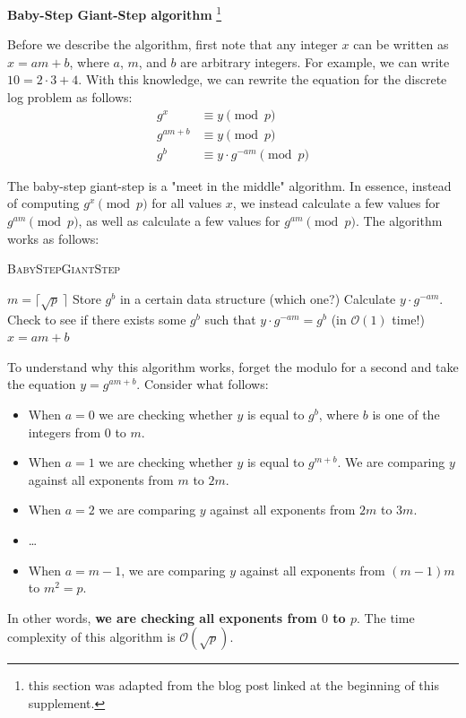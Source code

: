 \documentclass{article}
\begin{document}
    \begin{center}
        \textbf{Baby-Step Giant-Step algorithm}
        \footnote{this section was adapted from the blog post linked at the beginning of this supplement.}
    \end{center}

    Before we describe the algorithm, first note that any integer $x$ can be written as $x = am + b$, where $a$, $m$, and $b$ are arbitrary integers. For example, we can write $10 = 2 \cdot 3 + 4$. With this knowledge, we can rewrite the equation for the discrete log problem as follows:
    \begin{align*}
        g^{x} &\equiv y \pmod{p} \\
        g^{am + b} &\equiv y\pmod{p} \\
        g^{b} &\equiv y \cdot g^{-am} \pmod{p}
     \end{align*}

     The baby-step giant-step is a "meet in the middle" algorithm. In essence, instead of computing $g^{x} \pmod{p}$ for all values $x$, we instead calculate a few values for $g^{am} \pmod{p}$, as well as calculate a few values for $g^{am} \pmod{p}$. The algorithm works as follows:

     \begin{algorithm}
        \caption{\textsc{BabyStepGiantStep}}
        \label{alg:bsgs}
        \begin{algorithmic}
            \State $m = \lceil \sqrt{p}\ \rceil$
                \State Store $g^{b}$ in a certain data structure (which one?)
            \EndFor
                \State Calculate $y \cdot g^{-am}$.
                \State Check to see if there exists some $g^{b}$ such that $y \cdot g^{-am} = g^{b}$ (in $\mathcal{O}(1)$ time!)
            \EndFor
            \Return $x = am + b$
        \end{algorithmic}
    \end{algorithm}
    To understand why this algorithm works, forget the modulo for a second and take the equation $y = g^{am + b}$. Consider what follows:
    \begin{itemize}
        \item When $a = 0$ we are checking whether $y$ is equal to $g^{b}$, where $b$ is one of the integers from $0$ to $m$.
        \item When $a = 1$ we are checking whether $y$ is equal to $g^{m + b}$. We are comparing $y$ against all exponents from $m$ to $2m$.
        \item When $a = 2$ we are comparing $y$ against all exponents from $2m$ to $3m$.
        \item \dots
        \item When $a = m - 1$, we are comparing $y$ against all exponents from $(m - 1)m$ to $m^{2} = p$.
    \end{itemize}
    In other words, \textbf{we are checking all exponents from $0$ to $p$}. The time complexity of this algorithm is $\mathcal{O}(\sqrt{p})$.
    
\end{document}
